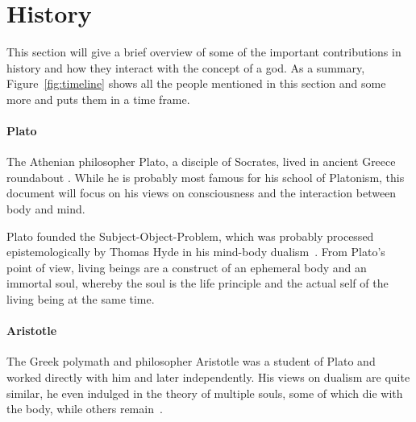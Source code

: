 \section{History}
\label{sec:History}

\begin{figure*}
    \caption[The Timeline]{Timeline of the presented persons. Those grayed out are left as a reference for other mentions in this document~\cite{wikimedia2021}. Rounded rectangles ( and ) denote the full life span of the respective person.}
    \label{fig:timeline}
\end{figure*}

This section will give a brief overview of some of the important contributions in history and how they interact with the concept of a god.
As a summary, Figure~\ref{fig:timeline} shows all the people mentioned in this section and some more and puts them in a time frame.

\paragraph{Plato}
The Athenian philosopher Plato, a disciple of Socrates, lived in ancient Greece roundabout .
While he is probably most famous for his school of Platonism, this document will focus on his views on consciousness and the interaction between body and mind.

Plato founded the Subject-Object-Problem, which was probably processed epistemologically by Thomas Hyde in his mind-body dualism~\cite{plato360}.
From Plato's point of view, living beings are a construct of an ephemeral body and an immortal soul, whereby the soul is the life principle and the actual self of the living being at the same time.


\paragraph{Aristotle}
The Greek polymath and philosopher Aristotle was a student of Plato and worked directly with him and later independently.
His views on dualism are quite similar, he even indulged in the theory of multiple souls, some of which die with the body, while others remain~\cite{aristotle350,hicks2015aristotle}.


